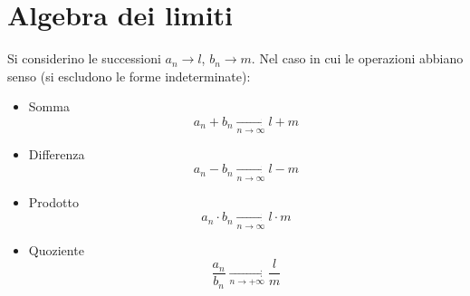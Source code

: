 \documentclass[10pt, oneside]{book}
\theoremstyle{plain}
\begin{document}
\section{Algebra dei limiti}
\begin{ther}
    Si considerino le successioni $a_n \rightarrow l$, $b_n \rightarrow m$. Nel caso in cui le operazioni abbiano senso (si escludono le forme indeterminate):
    \begin{itemize}
        \item Somma \[a_n + b_n \xrightarrow[n \rightarrow \infty]{} l + m\]
        \item Differenza \[a_n - b_n \xrightarrow[n \rightarrow \infty]{} l - m\]
        \item Prodotto \[a_n \cdot b_n \xrightarrow[n \rightarrow \infty]{} l \cdot m\]
        \item Quoziente \[\frac{a_n}{b_n} \xrightarrow[n \rightarrow +\infty]{} \frac{l}{m}\]
    \end{itemize}
\end{ther}
\end{document}
